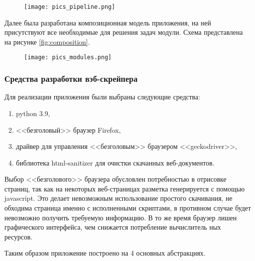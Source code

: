 \documentclass[../main]{subfiles}
\begin{document}
\begin{figure}[H]
    \centering
    {\texttt{[image: pics\_pipeline.png]}}
    \vspace{-\baselineskip}
\end{figure}

Далее была разработана композиционная модель приложения, на ней присутствуют все необходимые для решения задач модули. Схема представлена на рисунке \ref{fig:composition}.

\begin{figure}[H]
    \centering
    {\texttt{[image: pics\_modules.png]}}
    \vspace{-\baselineskip}
\end{figure}

\subsubsection{Средства разработки вэб-скрейпера}
Для реализации приложения были выбраны следующие средства:
\begin{enumerate}
    \item python 3.9,
    \item <<безголовый>> браузер Firefox,
    \item драйвер для управления <<безголовым>> браузером <<geckodriver>>,
    \item библиотека html-sanitizer для очистки скачанных веб-документов. 
\end{enumerate}

Выбор <<безголового>> браузера обусловлен потребностью в отрисовке страниц, так как на некоторых веб-страницах разметка генерируется с помощью javascript. Это делает невозможным использование простого скачивания, не обходима страница именно с исполненными скриптами, в противном случае будет невозможно получить требуемую информацию. В то же время браузер лишен графического интерфейса, чем снижается потребление вычислитель ных ресурсов. 

Таким образом приложение построено на 4 основных абстракциях.
\end{document}
